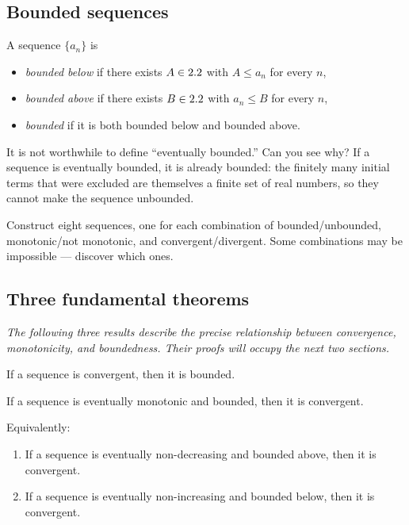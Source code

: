 \subsection*{Bounded sequences}

\begin{definition}
\label{def:11-6}
A sequence $\{a_{n}\}$ is
\begin{itemize}
  \item \emph{bounded below} if there exists $A\in2.2$ with $A\le a_{n}$ for every $n$,
  \item \emph{bounded above} if there exists $B\in2.2$ with $a_{n}\le B$ for every $n$,
  \item \emph{bounded} if it is both bounded below and bounded above.
\end{itemize}
\end{definition}

\begin{remark}
It is not worthwhile to define ``eventually bounded.''  Can you see why?  If a sequence is eventually bounded, it is already bounded: the finitely many initial terms that were excluded are themselves a finite set of real numbers, so they cannot make the sequence unbounded.
\end{remark}

\begin{remark}
Construct eight sequences, one for each combination of bounded/unbounded, monotonic/not monotonic, and convergent/divergent.  Some combinations may be impossible --- discover which ones.
\end{remark}

\subsection*{Three fundamental theorems}

\textit{The following three results describe the precise relationship between convergence, monotonicity, and boundedness.  Their proofs will occupy the next two sections.}

\begin{theorem}
\label{thm:11-5}
If a sequence is convergent, then it is bounded.
\end{theorem}

\begin{theorem}
\label{thm:11-6}
If a sequence is eventually monotonic and bounded, then it is convergent.

Equivalently:
\begin{enumerate}[label=(\roman*)]
  \item If a sequence is eventually non-decreasing and bounded above, then it is convergent.
  \item If a sequence is eventually non-increasing and bounded below, then it is convergent.
\end{enumerate}
\end{theorem}

